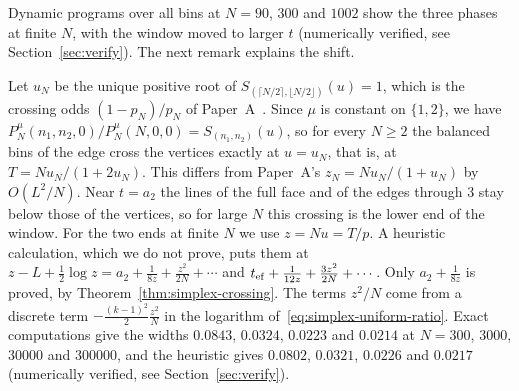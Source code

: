 Dynamic programs over all bins at $N=90$, $300$ and $1002$ show the three phases at
finite $N$, with the window moved to larger $t$ (numerically verified, see
Section~\ref{sec:verify}). The next remark explains the shift.

\begin{remark}\label{rem:K3-finite}
Let $u_N$ be the unique positive root of
$S_{(\lceil N/2\rceil,\lfloor N/2\rfloor)}(u)=1$, which is the crossing odds
$(1-p_N)/p_N$ of Paper~A~\cite[Theorem~3.1]{paperA}. Since $\mu$ is constant on
$\{1,2\}$, we have $P^\mu_N(n_1,n_2,0)/P^\mu_N(N,0,0)=S_{(n_1,n_2)}(u)$, so for
every $N\ge2$ the balanced bins of the edge cross the vertices exactly at
$u=u_N$, that is, at $T=Nu_N/(1+2u_N)$. This differs from Paper~A's
$z_N=Nu_N/(1+u_N)$ by $O(L^2/N)$. Near $t=a_2$ the lines of the full face and of
the edges through $3$ stay below those of the vertices, so for large $N$ this
crossing is the lower end of the window. For the two ends at finite $N$ we use
$z=Nu=T/p$. A heuristic calculation, which we do not prove, puts them at
$z-L+\frac12\log z=a_2+\frac1{8z}+\frac{z^2}{2N}+\cdots$ and
$t_{\rm ef}+\frac1{12z}+\frac{3z^2}{2N}+\cdots$. Only $a_2+\frac1{8z}$ is
proved, by Theorem~\ref{thm:simplex-crossing}. The terms $z^2/N$ come from a
discrete term $-\frac{(k-1)^2}2\frac{z^2}N$ in the logarithm
of~\eqref{eq:simplex-uniform-ratio}. Exact computations give the widths
$0.0843$, $0.0324$, $0.0223$ and $0.0214$ at $N=300$, $3000$, $30000$ and
$300000$, and the heuristic gives $0.0802$, $0.0321$, $0.0226$ and $0.0217$
(numerically verified, see Section~\ref{sec:verify}).
\end{remark}
